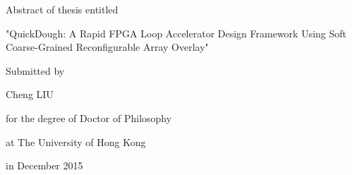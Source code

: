 
\begin{center}
\small Abstract of thesis entitled

\LARGE "QuickDough: A Rapid FPGA Loop Accelerator Design Framework Using Soft Coarse-Grained
Reconfigurable Array Overlay"

\vspace{5mm}
\small Submitted by 

\large Cheng LIU

\vspace{5mm}
\small for the degree of Doctor of Philosophy

at The University of Hong Kong

in December 2015

\vspace{5mm}
\end{center}
